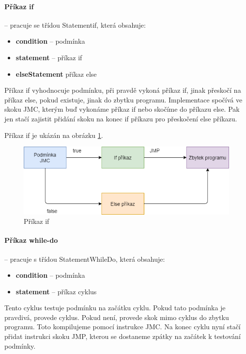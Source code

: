 \documentclass[
12pt,
a4paper,
pdftex,
czech,
titlepage
]{report}
\begin{document}
\paragraph{Příkaz if} -- pracuje se třídou Statementif, která obsahuje:
\begin{itemize}
\item \textbf{condition} -- podmínka
\item \textbf{statement} -- příkaz if
\item \textbf{elseStatement} příkaz else
\end{itemize}

Příkaz if vyhodnocuje podmínku, při pravdě vykoná příkaz if, jinak přeskočí na příkaz else, pokud existuje, jinak do zbytku programu. Implementace spočívá ve skoku JMC, kterým buď vykonáme příkaz if nebo skočíme do příkazu else. Pak jen stačí zajistit přidání skoku na konec if příkazu pro přeskočení else příkazu.

Příkaz if je ukázán na obrázku \ref{if}.

\begin{figure}[H]
\caption{Příkaz if}
\label{if}
\includegraphics[width=\textwidth]{if.png}
\end{figure}

\paragraph{Příkaz while-do} -- pracuje s třídou StatementWhileDo, která obsahuje:
\begin{itemize}
\item \textbf{condition} -- podmínka
\item \textbf{statement} -- příkaz cyklus
\end{itemize}

Tento cyklus testuje podmínku na začátku cyklu. Pokud tato podmínka je pravdivá, provede cyklus. Pokud není, provede skok mimo cyklus do zbytku programu. Toto kompilujeme pomocí instrukce JMC. Na konec cyklu nyní stačí přidat instrukci skoku JMP, kterou se dostaneme zpátky na začátek k testování podmínky.
\end{document}
